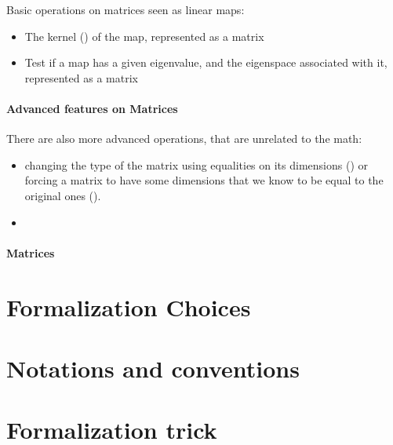 Basic operations on matrices seen as linear maps:
\begin{itemize}
\item The kernel () of the map, represented as a matrix
\item Test if a map has a given eigenvalue, and the eigenspace
  associated with it, represented as a matrix
\end{itemize}


\paragraph{Advanced features on Matrices}

There are also more advanced operations, that are unrelated to the
math:
\begin{itemize}
\item changing the type of the matrix using equalities on its
  dimensions () or forcing a matrix to have some dimensions
  that we know to be equal to the original ones ().
\item 
\end{itemize}

\paragraph{Matrices}

\section{Formalization Choices}

\section{Notations and conventions}

\section{Formalization trick}


